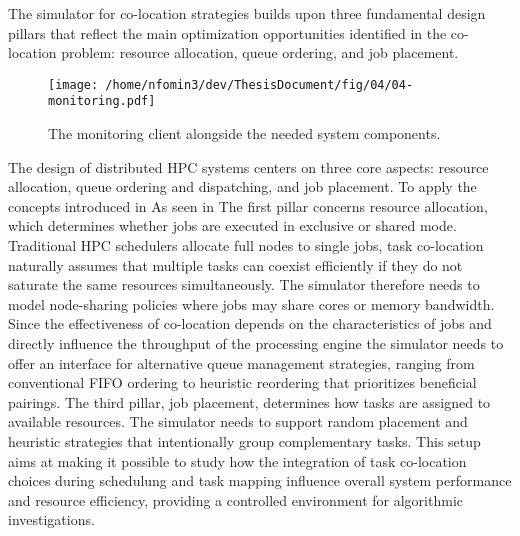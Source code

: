 The simulator for co-location strategies builds upon three fundamental design pillars that reflect the main optimization opportunities identified in the co-location problem: resource allocation, queue ordering, and job placement.

\begin{figure}[htbp]
    \centering
    \texttt{[image: /home/nfomin3/dev/ThesisDocument/fig/04/04-monitoring.pdf]} %
    \caption{The monitoring client alongside the needed system components.}
    \label{fig:monitoring_client}
\end{figure}

The design of distributed HPC systems centers on three core aspects: resource allocation, queue ordering and dispatching, and job placement. To apply the concepts introduced in %
As seen in %
The first pillar concerns resource allocation, which determines whether jobs are executed in exclusive or shared mode. Traditional HPC schedulers allocate full nodes to single jobs, task co-location naturally assumes that multiple tasks can coexist efficiently if they do not saturate the same resources simultaneously. The simulator therefore needs to model node-sharing policies where jobs may share cores or memory bandwidth.
Since the effectiveness of co-location depends on the characteristics of jobs and directly influence the throughput of the processing engine the simulator needs to offer an interface for alternative queue management strategies, ranging from conventional FIFO ordering to heuristic reordering that prioritizes beneficial pairings.
The third pillar, job placement, determines how tasks are assigned to available resources. The simulator needs to support random placement and heuristic strategies that intentionally group complementary tasks.
This setup aims at making it possible to study how the integration of task co-location choices during schedulung and task mapping influence overall system performance and resource efficiency, providing a controlled environment for algorithmic investigations.


